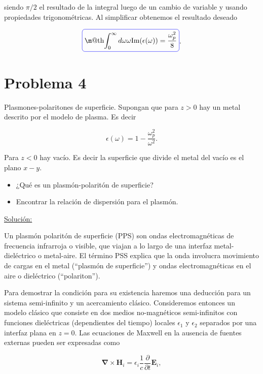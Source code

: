 \documentclass[a4paper,11pt]{article}
\makeatletter
\numberwithin{equation}{section}
\newcommand*{\boxcolor}{blue}
\renewcommand{\boxed}[1]{\textcolor{\boxcolor}{%
\tikz[baseline={([yshift=-1ex]current bounding box.center)}] \node [rectangle, minimum width=1ex,rounded corners,draw] {\normalcolor\m@th$\displaystyle#1$};}}
\makeatother
\begin{document}
siendo $\pi/2$ el resultado de la integral luego de un cambio de variable y usando 
propiedades trigonométricas. Al simplificar obtenemos el resultado deseado 

\begin{equation}
 \boxed{\int_0^\infty d\omega \omega \text{Im}(\epsilon(\omega)) = \frac{\omega_p^2}{8}}.
\end{equation}

\section{Problema 4}

Plasmones-polaritones de superficie. Supongan que para $z > 0$ hay un metal descrito por el modelo de plasma. Es decir 

$$
\epsilon(\omega) = 1 - \frac{\omega_p^2}{\omega^2}.
$$

Para $z < 0$ hay vacío. Es decir la superficie que divide el metal del vacío es el plano $x - y$.

\begin{itemize}
 \item ¿Qué es un plasmón-polaritón de superficie?
 \item Encontrar la relación de dispersión para el plasmón.
\end{itemize}

\vspace{.3cm}

\underline{Solución:} \vspace{.3cm}

Un plasmón polaritón de superficie (PPS) son ondas electromagnéticas de frecuencia
infrarroja o visible, que viajan a lo largo de una interfaz metal-dieléctrico o 
metal-aire. El término PSS explica que la onda involucra movimiento de cargas en 
el metal (``plasmón de superficie'') y ondas electromagnéticas en el aire 
o dieléctrico (``polariton''). 

\vspace{.3cm}

Para demostrar la condición para su existencia haremos una deducción para un 
sistema semi-infinito y un acercamiento clásico. Consideremos entonces un modelo 
clásico que consiste en dos medios no-magnéticos semi-infinitos con funciones 
dieléctricas (dependientes del tiempo) locales $\epsilon_1$ y $\epsilon_2$ 
separados por una interfaz plana en $z = 0$. Las ecuaciones de Maxwell en la 
ausencia de fuentes externas pueden ser expresadas como 

\begin{equation}
 \pmb{\nabla} \times \mathbf{H}_i = \epsilon_i \frac{1}{c} \frac{\partial}{\partial t} 
 \mathbf{E}_i,
\end{equation}
\end{document}
